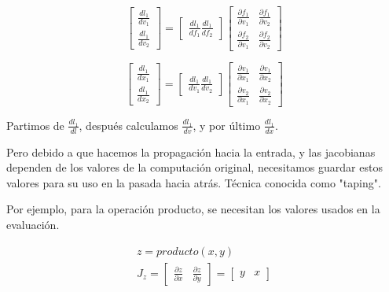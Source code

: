 \begin{equation}
	\begin{bmatrix}
		\frac{dl_1}{dv_1} \\
		\frac{dl_1}{dv_2}
	\end{bmatrix}
	=
	\begin{bmatrix}
		\frac{dl_1}{df_1}
		\frac{dl_1}{df_2}
	\end{bmatrix}
	\begin{bmatrix}
		\frac{\partial f_1}{\partial v_1} & \frac{\partial f_1}{\partial v_2} \\
		\frac{\partial f_2}{\partial v_1} & \frac{\partial f_2}{\partial v_2}
	\end{bmatrix}
\end{equation}

\begin{equation}
	\begin{bmatrix}
		\frac{dl_1}{dx_1} \\
		\frac{dl_1}{dx_2}
	\end{bmatrix}
	=
	\begin{bmatrix}
		\frac{dl_1}{dv_1}
		\frac{dl_1}{dv_2}
	\end{bmatrix}
	\begin{bmatrix}
		\frac{\partial v_1}{\partial x_1} & \frac{\partial v_1}{\partial x_2} \\
		\frac{\partial v_2}{\partial x_1} & \frac{\partial v_2}{\partial x_2}
	\end{bmatrix}
\end{equation}

Partimos de $\frac{dl_1}{dl}$, después calculamos $\frac{dl_1}{dv}$, y por
último $\frac{dl_1}{dx}$.

Pero debido a que hacemos la propagación hacia la entrada, y las jacobianas
dependen de los valores de la computación original, necesitamos guardar estos
valores para su uso en la pasada hacia atrás. Técnica conocida como "taping".

Por ejemplo, para la operación producto, se necesitan los valores usados en la
evaluación.

\begin{align}
	z = producto(x, y) \\
	J_{z} =
	\begin{bmatrix}
		\frac{\partial z}{\partial x} & \frac{\partial z}{\partial y}
	\end{bmatrix}
	=
	\begin{bmatrix}
		y & x
	\end{bmatrix}
\end{align}


